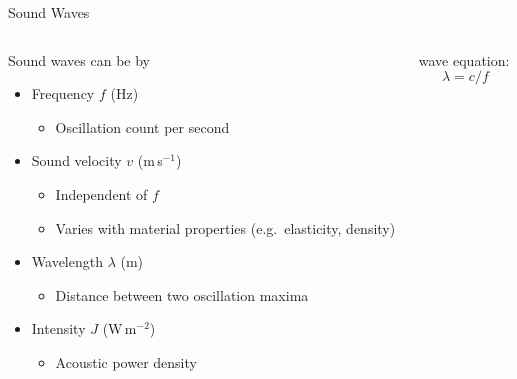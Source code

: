 \begin{frame}{Sound Waves \cont}
    \begin{columns}[c, onlytextwidth]
        \begin{column}{0.6\textwidth}
            Sound waves can be  by

            \vspace{.5cm}
            \begin{itemize}
                \setlength\itemsep{0.3cm}
                \item Frequency $f$ (Hz)
                      \begin{itemize}
                          \item Oscillation count per second
                      \end{itemize}
                \item Sound velocity $v$ (m\,s$^{-1}$)
                      \begin{itemize}
                          \item Independent of $f$
                          \item Varies with material properties (e.g.~elasticity, density)
                      \end{itemize}
                \item Wavelength $\lambda$ (m)\\
                      \begin{itemize}
                          \item Distance between two oscillation maxima
                      \end{itemize}
                \item Intensity $J$ (W\,m$^{-2}$)\\
                      \begin{itemize}
                          \item Acoustic power density
                      \end{itemize}
            \end{itemize}
        \end{column}\begin{column}{0.5\textwidth}
            \centering{}
             wave equation:
            \begin{equation*}
                \lambda = c / f
            \end{equation*}
        \end{column}
    \end{columns}
\end{frame}



